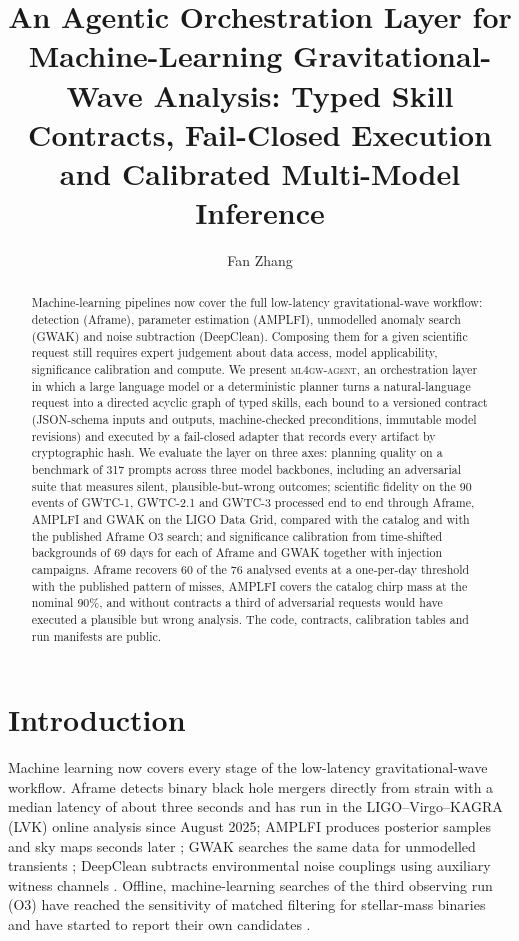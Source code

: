 \documentclass[twocolumn]{aastex631}
\newcommand{\agent}{\textsc{ml4gw-agent}}
\begin{document}
\title{An Agentic Orchestration Layer for Machine-Learning Gravitational-Wave Analysis: Typed Skill Contracts, Fail-Closed Execution and Calibrated Multi-Model Inference}

\author[0000-0000-0000-0000]{Fan Zhang}

\begin{abstract}
Machine-learning pipelines now cover the full low-latency gravitational-wave workflow: detection (Aframe), parameter estimation (AMPLFI), unmodelled anomaly search (GWAK) and noise subtraction (DeepClean). Composing them for a given scientific request still requires expert judgement about data access, model applicability, significance calibration and compute. We present \agent, an orchestration layer in which a large language model or a deterministic planner turns a natural-language request into a directed acyclic graph of typed skills, each bound to a versioned contract (JSON-schema inputs and outputs, machine-checked preconditions, immutable model revisions) and executed by a fail-closed adapter that records every artifact by cryptographic hash. We evaluate the layer on three axes: planning quality on a benchmark of 317 prompts across three model backbones, including an adversarial suite that measures silent, plausible-but-wrong outcomes; scientific fidelity on the 90 events of GWTC-1, GWTC-2.1 and GWTC-3 processed end to end through Aframe, AMPLFI and GWAK on the LIGO Data Grid, compared with the catalog and with the published Aframe O3 search; and significance calibration from time-shifted backgrounds of 69 days for each of Aframe and GWAK together with injection campaigns. Aframe recovers 60 of the 76 analysed events at a one-per-day threshold with the published pattern of misses, AMPLFI covers the catalog chirp mass at the nominal 90\%, and without contracts a third of adversarial requests would have executed a plausible but wrong analysis. The code, contracts, calibration tables and run manifests are public.
\end{abstract}


\section{Introduction}
\label{sec:intro}

Machine learning now covers every stage of the low-latency
gravitational-wave workflow. Aframe detects binary black hole mergers
directly from strain with a median latency of about three seconds
\citep{aframe2025} and has run in the LIGO--Virgo--KAGRA (LVK) online
analysis since August 2025; AMPLFI produces posterior samples and sky maps
seconds later \citep{amplfi2025}; GWAK searches the same data for
unmodelled transients \citep{gwak2024}; DeepClean subtracts environmental
noise couplings using auxiliary witness channels \citep{deepclean2020}.
Offline, machine-learning searches of the third observing run (O3) have
reached the sensitivity of matched filtering for stellar-mass binaries and
have started to report their own candidates \citep{marx2025,koloniari2025,
silver2025}.
\end{document}
